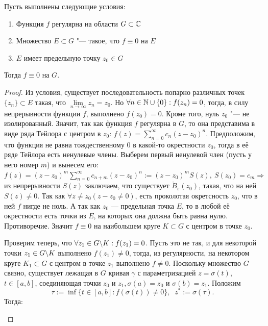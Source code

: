 \begin{theorem}
	Пусть выполнены следующие условия:
	\begin{enumerate}
		\item Функция $f$ регулярна на области $G \subset \mathbb{C}$
		\item Множество $E \subset G$ "--- такое, что $f \equiv 0$ на $E$
		\item $E$ имеет предельную точку $z_0 \in G$
	\end{enumerate}
	
	Тогда $f \equiv 0$ на $G$.
\end{theorem}

\begin{proof}
	Из условия, существует последовательность попарно различных точек $\{z_n\} \subset E$ такая, что $\lim\limits_{n \to \infty}z_n = z_0$. Но $\forall n \in \mathbb{N} \cup \{0\}: f(z_n) = 0$, тогда, в силу непрерывности функции $f$, выполнено $f(z_0) = 0$. Кроме того, нуль $z_0$ "--- не изолированный. Значит, так как функция $f$ регулярна в $G$, то она представима в виде ряда Тейлора с центром в $z_0$: \(f(z) = \sum\limits_{n=0}^{\infty} c_n (z-z_0)^n\). Предположим, что функция не равна тождественному $0$ в какой-то окрестности $z_0$, тогда в её ряде Тейлора есть ненулевые члены. Выберем первый ненулевой член (пусть у него номер $m$) и вынесем его: \(f(z) = (z-z_0)^m \sum\limits_{n=0}^\infty c_{n+m}(z-z_0)^n:=(z-z_0)^m S(z), \: S(z_0)=c_m \Rightarrow\) из непрерывности $S(z)$ заключаем, что существует \(\mathring{B}_\varepsilon(z_0)\), такая, что на ней $S(z) \neq 0$. Так как \(\forall z \neq z_0\left(z-z_0 \neq 0 \right)\), есть проколотая окретсность \(z_0\), что в ней \(f\) нигде не ноль. А так как \(z_0\) --- предельная точка \(E\), то в любой её окрестности есть точки из \(E\), на которых она должна быть равна нулю. Противоречие. Значит $f \equiv 0$ на наибольшем круге $K \subset G$ с центром в точке $z_0$.
	
	Проверим теперь, что $\forall z_1 \in G \backslash K : f(z_1) = 0$. Пусть это не так, и для некоторой точки $z_1 \in G \backslash K$ выполнено $f(z_1) \ne 0$, тогда, из регулярности, на некотором круге $K_1 \subset G$ с центром в точке $z_1$ выполнено $f \ne 0$. Поскольку множество $G$ связно, существует лежащая в $G$ кривая $\gamma$ с параметризацией $z = \sigma(t)$, $t \in [a, b]$, соединяющая точки $z_0$ и $z_1, \sigma(a) = z_0$ и \(\sigma(b)=z_1\). Положим $$\tau := \inf\{t \in [a, b]: f(\sigma(t)) \ne 0\},\;\; z^* := \sigma(\tau).$$ Тогда:
	\begin{center}
\end{center}
\end{proof}

